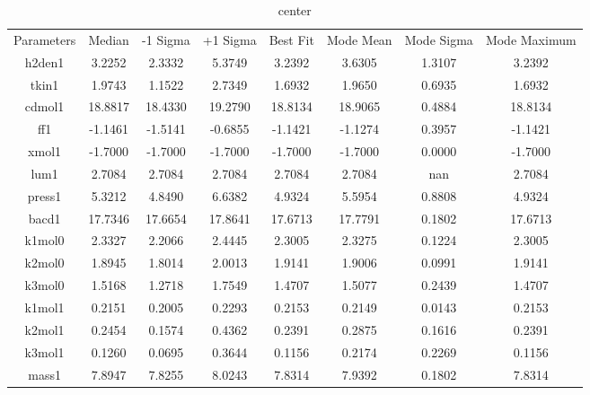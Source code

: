 \documentclass[12pt]{article}
\begin{document}
\begin{table}
\caption{center}
\begin{tabular}{cccccccc}
Parameters & Median & -1 Sigma & +1 Sigma & Best Fit & Mode Mean & Mode Sigma & Mode Maximum \\
h2den1 & 3.2252 & 2.3332 & 5.3749 & 3.2392 & 3.6305 & 1.3107 & 3.2392 \\
tkin1 & 1.9743 & 1.1522 & 2.7349 & 1.6932 & 1.9650 & 0.6935 & 1.6932 \\
cdmol1 & 18.8817 & 18.4330 & 19.2790 & 18.8134 & 18.9065 & 0.4884 & 18.8134 \\
ff1 & -1.1461 & -1.5141 & -0.6855 & -1.1421 & -1.1274 & 0.3957 & -1.1421 \\
xmol1 & -1.7000 & -1.7000 & -1.7000 & -1.7000 & -1.7000 & 0.0000 & -1.7000 \\
lum1 & 2.7084 & 2.7084 & 2.7084 & 2.7084 & 2.7084 & nan & 2.7084 \\
press1 & 5.3212 & 4.8490 & 6.6382 & 4.9324 & 5.5954 & 0.8808 & 4.9324 \\
bacd1 & 17.7346 & 17.6654 & 17.8641 & 17.6713 & 17.7791 & 0.1802 & 17.6713 \\
k1mol0 & 2.3327 & 2.2066 & 2.4445 & 2.3005 & 2.3275 & 0.1224 & 2.3005 \\
k2mol0 & 1.8945 & 1.8014 & 2.0013 & 1.9141 & 1.9006 & 0.0991 & 1.9141 \\
k3mol0 & 1.5168 & 1.2718 & 1.7549 & 1.4707 & 1.5077 & 0.2439 & 1.4707 \\
k1mol1 & 0.2151 & 0.2005 & 0.2293 & 0.2153 & 0.2149 & 0.0143 & 0.2153 \\
k2mol1 & 0.2454 & 0.1574 & 0.4362 & 0.2391 & 0.2875 & 0.1616 & 0.2391 \\
k3mol1 & 0.1260 & 0.0695 & 0.3644 & 0.1156 & 0.2174 & 0.2269 & 0.1156 \\
mass1 & 7.8947 & 7.8255 & 8.0243 & 7.8314 & 7.9392 & 0.1802 & 7.8314 \\
\end{tabular}
\end{table}
\end{document}
